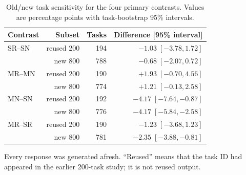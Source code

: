 \begin{table}[t]
\caption{Old/new task sensitivity for the four primary contrasts. Values are percentage points with task-bootstrap 95\% intervals.}
\label{tab:subgroup-sensitivity}
\centering\small
\begin{tabular}{@{}lrrr@{}}
\toprule
Contrast & Subset & Tasks & Difference [95\% interval]\\
\midrule
SR--SN & reused 200 & 194 & $-1.03\;[-3.78,1.72]$\\
       & new 800    & 788 & $-0.68\;[-2.07,0.72]$\\
MR--MN & reused 200 & 190 & $+1.93\;[-0.70,4.56]$\\
       & new 800    & 774 & $+1.21\;[-0.13,2.58]$\\
MN--SN & reused 200 & 192 & $-4.17\;[-7.64,-0.87]$\\
       & new 800    & 776 & $-4.17\;[-5.84,-2.58]$\\
MR--SR & reused 200 & 190 & $-1.23\;[-3.68,1.23]$\\
       & new 800    & 781 & $-2.35\;[-3.88,-0.81]$\\
\bottomrule
\end{tabular}
\par\smallskip\noindent Every response was generated afresh. ``Reused'' means that the task ID had appeared in the earlier 200-task study; it is not reused output.
\end{table}
